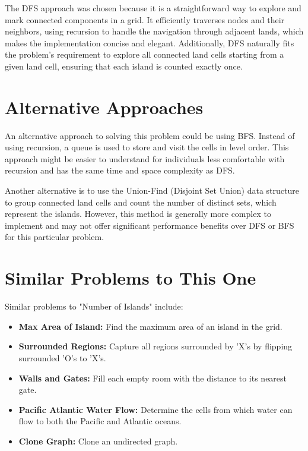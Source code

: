 The DFS approach was chosen because it is a straightforward way to explore and mark connected components in a grid. It efficiently traverses nodes and their neighbors, using recursion to handle the navigation through adjacent lands, which makes the implementation concise and elegant. Additionally, DFS naturally fits the problem's requirement to explore all connected land cells starting from a given land cell, ensuring that each island is counted exactly once.
    
\section*{Alternative Approaches}
    
An alternative approach to solving this problem could be using BFS. Instead of using recursion, a queue is used to store and visit the cells in level order. This approach might be easier to understand for individuals less comfortable with recursion and has the same time and space complexity as DFS.
    
Another alternative is to use the Union-Find (Disjoint Set Union) data structure to group connected land cells and count the number of distinct sets, which represent the islands. However, this method is generally more complex to implement and may not offer significant performance benefits over DFS or BFS for this particular problem.
    
\section*{Similar Problems to This One}
    
Similar problems to "Number of Islands" include:
    
\begin{itemize}
    \item \textbf{Max Area of Island:} Find the maximum area of an island in the grid.
    
    \item \textbf{Surrounded Regions:} Capture all regions surrounded by 'X's by flipping surrounded 'O's to 'X's.
    
    \item \textbf{Walls and Gates:} Fill each empty room with the distance to its nearest gate.
    
    \item \textbf{Pacific Atlantic Water Flow:} Determine the cells from which water can flow to both the Pacific and Atlantic oceans.
    
    \item \textbf{Clone Graph:} Clone an undirected graph.
\end{itemize}
    
